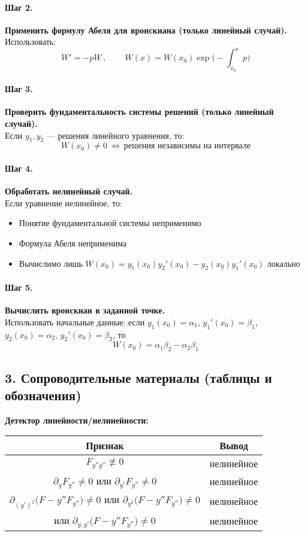\paragraph{Шаг 2.} \textbf{Применить формулу Абеля для вронскиана (только линейный случай).}\\
Использовать:
\[
\boxed{\,W'=-pW\,},\qquad \boxed{\,W(x)=W(x_0)\exp\!\big(-\int_{x_0}^{x}p\big)\,}
\]

\paragraph{Шаг 3.} \textbf{Проверить фундаментальность системы решений (только линейный случай).}\\
Если \(y_1,y_2\) — решения линейного уравнения, то:
\[
\boxed{\,W(x_0)\neq0\ \Leftrightarrow\ \text{решения независимы на интервале}\,}
\]

\paragraph{Шаг 4.} \textbf{Обработать нелинейный случай.}\\
Если уравнение нелинейное, то:
\begin{itemize}
\item Понятие фундаментальной системы неприменимо
\item Формула Абеля неприменима
\item Вычислимо лишь \(W(x_0)=y_1(x_0)y_2'(x_0)-y_2(x_0)y_1'(x_0)\) локально
\end{itemize}

\paragraph{Шаг 5.} \textbf{Вычислить вронскиан в заданной точке.}\\
Использовать начальные данные: если \(y_1(x_0)=\alpha_1\), \(y_1'(x_0)=\beta_1\), \(y_2(x_0)=\alpha_2\), \(y_2'(x_0)=\beta_2\), то
\[
W(x_0)=\alpha_1\beta_2-\alpha_2\beta_1
\]

\subsection*{3. Сопроводительные материалы (таблицы и обозначения)}

\textbf{Детектор линейности/нелинейности:}
\begin{center}
\begin{tabular}{|c|c|}
\hline
\textbf{Признак} & \textbf{Вывод} \\ \hline
\(F_{y''y''}\not\equiv0\) & нелинейное \\ \hline
\(\partial_{y}F_{y''}\ne0\) или \(\partial_{y'}F_{y''}\ne0\) & нелинейное \\ \hline
\(\partial_{(y')^2}\big(F-y''F_{y''}\big)\ne0\) или \(\partial_{y^2}\big(F-y''F_{y''}\big)\ne0\) & нелинейное \\ \hline
или \(\partial_{y,y'}\big(F-y''F_{y''}\big)\ne0\) & нелинейное \\ \hline
\end{tabular}
\end{center}

